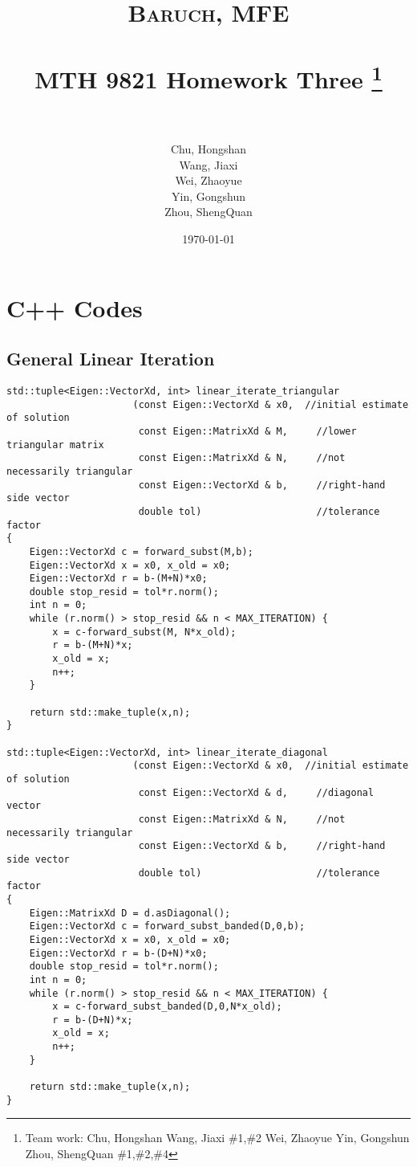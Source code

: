\documentclass[paper=a4, fontsize=11pt]{scrartcl} %
\title{	
\normalfont \normalsize
\textsc{Baruch, MFE} \\ [25pt] %
\horrule{0.5pt} \\[0.4cm] %
\huge MTH 9821 Homework Three \footnote{Team work:\newline
Chu, Hongshan \newline 
Wang, Jiaxi \#1,\#2 \newline
Wei, Zhaoyue \newline 
Yin, Gongshun \newline
Zhou, ShengQuan \#1,\#2,\#4 }\\  %
\horrule{2pt} \\[0.5cm] %
}
\author{Chu, Hongshan\\
Wang, Jiaxi\\
Wei, Zhaoyue\\
Yin, Gongshun\\
Zhou, ShengQuan} %
\date{\normalsize\today} %
\numberwithin{equation}{section} %
\numberwithin{figure}{section} %
\numberwithin{table}{section} %
\begin{document}
	


\maketitle %

\newpage



\section{C++ Codes}
\subsection{General Linear Iteration}
\begin{lstlisting}
std::tuple<Eigen::VectorXd, int> linear_iterate_triangular
                      (const Eigen::VectorXd & x0,  //initial estimate of solution
                       const Eigen::MatrixXd & M,     //lower triangular matrix
                       const Eigen::MatrixXd & N,     //not necessarily triangular
                       const Eigen::VectorXd & b,     //right-hand side vector
                       double tol)                    //tolerance factor
{
    Eigen::VectorXd c = forward_subst(M,b);
    Eigen::VectorXd x = x0, x_old = x0;
    Eigen::VectorXd r = b-(M+N)*x0; 
    double stop_resid = tol*r.norm();
    int n = 0;
    while (r.norm() > stop_resid && n < MAX_ITERATION) {
        x = c-forward_subst(M, N*x_old);
        r = b-(M+N)*x;
        x_old = x;
        n++;
    }

    return std::make_tuple(x,n);
}

std::tuple<Eigen::VectorXd, int> linear_iterate_diagonal
                      (const Eigen::VectorXd & x0,  //initial estimate of solution
                       const Eigen::VectorXd & d,     //diagonal vector
                       const Eigen::MatrixXd & N,     //not necessarily triangular
                       const Eigen::VectorXd & b,     //right-hand side vector
                       double tol)                    //tolerance factor
{
    Eigen::MatrixXd D = d.asDiagonal();
    Eigen::VectorXd c = forward_subst_banded(D,0,b);
    Eigen::VectorXd x = x0, x_old = x0;
    Eigen::VectorXd r = b-(D+N)*x0; 
    double stop_resid = tol*r.norm();
    int n = 0;
    while (r.norm() > stop_resid && n < MAX_ITERATION) {
        x = c-forward_subst_banded(D,0,N*x_old);
        r = b-(D+N)*x;
        x_old = x;
        n++;
    }

    return std::make_tuple(x,n);
}
\end{lstlisting}
\end{document}
